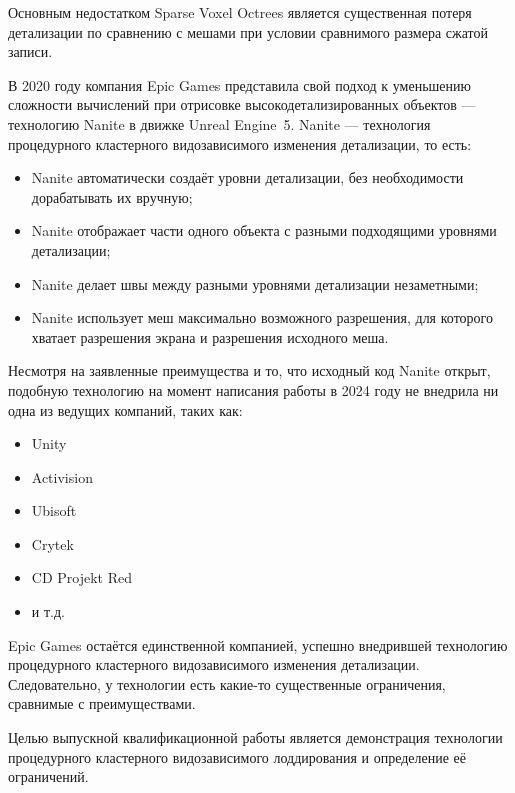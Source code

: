 Основным недостатком Sparse Voxel Octrees является существенная потеря детализации по сравнению с мешами при условии сравнимого размера сжатой записи.

В 2020 году компания Epic Games представила свой подход к уменьшению сложности вычислений при отрисовке высокодетализированных объектов --- технологию Nanite в движке Unreal Engine~5.
Nanite --- технология процедурного кластерного видозависимого изменения детализации, то есть:
\begin{itemize}
    \item Nanite автоматически создаёт уровни детализации, без необходимости дорабатывать их вручную;
    \item Nanite отображает части одного объекта с разными подходящими уровнями детализации;
    \item Nanite делает швы между разными уровнями детализации незаметными;
    \item Nanite использует меш максимально возможного разрешения, для которого хватает разрешения экрана и разрешения исходного меша.
\end{itemize}

Несмотря на заявленные преимущества и то, что исходный код Nanite открыт, подобную технологию на момент написания работы в 2024 году не внедрила ни одна из ведущих компаний, таких как:
\begin{itemize}
    \item Unity
    \item Activision
    \item Ubisoft
    \item Crytek
    \item CD Projekt Red
    \item и т.д.
\end{itemize}
Epic Games остаётся единственной компанией, успешно внедрившей технологию процедурного кластерного видозависимого изменения детализации.
Следовательно, у технологии есть какие-то существенные ограничения, сравнимые с преимуществами.

Целью выпускной квалификационной работы является демонстрация технологии процедурного кластерного видозависимого лоддирования и определение её ограничений.

